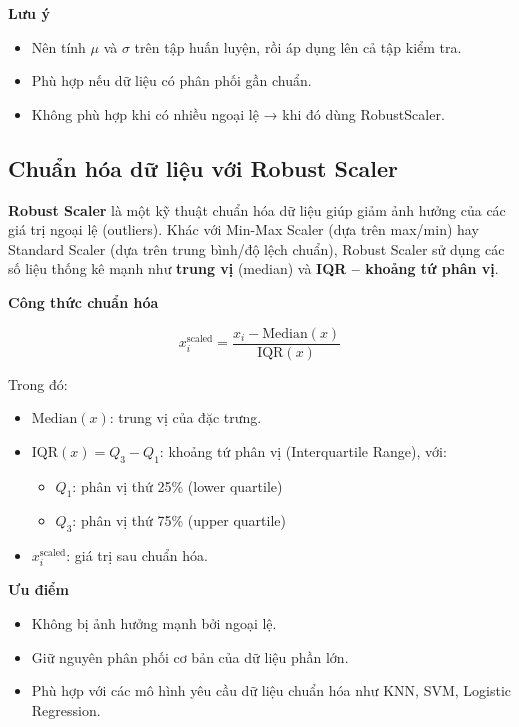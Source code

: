 \textbf{Lưu ý}

\begin{itemize}
    \item Nên tính \( \mu \) và \( \sigma \) trên tập huấn luyện, rồi áp dụng lên cả tập kiểm tra.
    \item Phù hợp nếu dữ liệu có phân phối gần chuẩn.
    \item Không phù hợp khi có nhiều ngoại lệ → khi đó dùng RobustScaler.
\end{itemize}

\subsection{Chuẩn hóa dữ liệu với Robust Scaler}
\label{scaler:robust}

\textbf{Robust Scaler} là một kỹ thuật chuẩn hóa dữ liệu giúp giảm ảnh hưởng của các giá trị ngoại lệ (outliers). Khác với Min-Max Scaler (dựa trên max/min) hay Standard Scaler (dựa trên trung bình/độ lệch chuẩn), Robust Scaler sử dụng các số liệu thống kê mạnh như \textbf{trung vị} (median) và \textbf{IQR – khoảng tứ phân vị}.

\textbf{Công thức chuẩn hóa}

\[
x_i^{\text{scaled}} = \frac{x_i - \text{Median}(x)}{\text{IQR}(x)}
\]

Trong đó:
\begin{itemize}
    \item \( \text{Median}(x) \): trung vị của đặc trưng.
    \item \( \text{IQR}(x) = Q_3 - Q_1 \): khoảng tứ phân vị (Interquartile Range), với:
        \begin{itemize}
            \item \( Q_1 \): phân vị thứ 25\% (lower quartile)
            \item \( Q_3 \): phân vị thứ 75\% (upper quartile)
        \end{itemize}
    \item \( x_i^{\text{scaled}} \): giá trị sau chuẩn hóa.
\end{itemize}

\textbf{Ưu điểm}

\begin{itemize}
    \item Không bị ảnh hưởng mạnh bởi ngoại lệ.
    \item Giữ nguyên phân phối cơ bản của dữ liệu phần lớn.
    \item Phù hợp với các mô hình yêu cầu dữ liệu chuẩn hóa như KNN, SVM, Logistic Regression.
\end{itemize}

